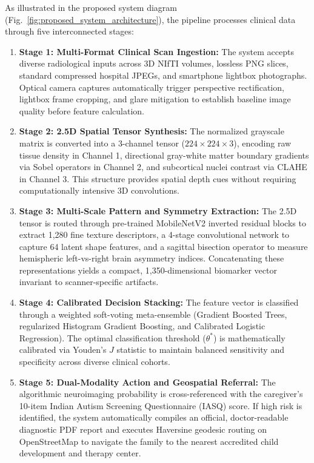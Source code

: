 \documentclass[conference]{IEEEtran}
\begin{document}
As illustrated in the proposed system diagram (Fig.~\ref{fig:proposed_system_architecture}), the pipeline processes clinical data through five interconnected stages:
\begin{enumerate}
    \item \textbf{Stage 1: Multi-Format Clinical Scan Ingestion:} The system accepts diverse radiological inputs across 3D NIfTI volumes, lossless PNG slices, standard compressed hospital JPEGs, and smartphone lightbox photographs. Optical camera captures automatically trigger perspective rectification, lightbox frame cropping, and glare mitigation to establish baseline image quality before feature calculation.
    
    \item \textbf{Stage 2: 2.5D Spatial Tensor Synthesis:} The normalized grayscale matrix is converted into a 3-channel tensor ($224 \times 224 \times 3$), encoding raw tissue density in Channel 1, directional gray-white matter boundary gradients via Sobel operators in Channel 2, and subcortical nuclei contrast via CLAHE in Channel 3. This structure provides spatial depth cues without requiring computationally intensive 3D convolutions.
    
    \item \textbf{Stage 3: Multi-Scale Pattern and Symmetry Extraction:} The 2.5D tensor is routed through pre-trained MobileNetV2 inverted residual blocks to extract 1,280 fine texture descriptors, a 4-stage convolutional network to capture 64 latent shape features, and a sagittal bisection operator to measure hemispheric left-vs-right brain asymmetry indices. Concatenating these representations yields a compact, 1,350-dimensional biomarker vector invariant to scanner-specific artifacts.
    
    \item \textbf{Stage 4: Calibrated Decision Stacking:} The feature vector is classified through a weighted soft-voting meta-ensemble (Gradient Boosted Trees, regularized Histogram Gradient Boosting, and Calibrated Logistic Regression). The optimal classification threshold ($\theta^*$) is mathematically calibrated via Youden's $J$ statistic to maintain balanced sensitivity and specificity across diverse clinical cohorts.
    
    \item \textbf{Stage 5: Dual-Modality Action and Geospatial Referral:} The algorithmic neuroimaging probability is cross-referenced with the caregiver's 10-item Indian Autism Screening Questionnaire (IASQ) score. If high risk is identified, the system automatically compiles an official, doctor-readable diagnostic PDF report and executes Haversine geodesic routing on OpenStreetMap to navigate the family to the nearest accredited child development and therapy center.
\end{enumerate}
\end{document}
